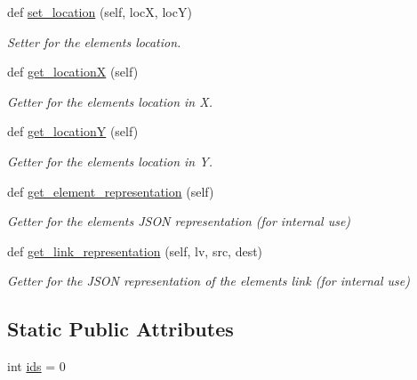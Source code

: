 \begin{DoxyCompactItemize}
def \hyperlink{classbridges_1_1element_1_1_element_aa1387621f7afa6b6f6acd052a1126320}{set\+\_\+location} (self, locX, locY)
\begin{DoxyCompactList}\small\item\em Setter for the element\textquotesingle{}s location. \end{DoxyCompactList}\item 
def \hyperlink{classbridges_1_1element_1_1_element_aa921953dab3cec5253e813bb1709895a}{get\+\_\+locationX} (self)
\begin{DoxyCompactList}\small\item\em Getter for the element\textquotesingle{}s location in X. \end{DoxyCompactList}\item 
def \hyperlink{classbridges_1_1element_1_1_element_a108f62843d084beaf5fcf5fd202853c5}{get\+\_\+locationY} (self)
\begin{DoxyCompactList}\small\item\em Getter for the element\textquotesingle{}s location in Y. \end{DoxyCompactList}\item 
def \hyperlink{classbridges_1_1element_1_1_element_a511fbc6323616d806ae0ae33010f4654}{get\+\_\+element\+\_\+representation} (self)
\begin{DoxyCompactList}\small\item\em Getter for the element\textquotesingle{}s J\+S\+ON representation (for internal use) \end{DoxyCompactList}\item 
def \hyperlink{classbridges_1_1element_1_1_element_a8f220d7b81c0e0dd84b9eff33ade76b9}{get\+\_\+link\+\_\+representation} (self, lv, src, dest)
\begin{DoxyCompactList}\small\item\em Getter for the J\+S\+ON representation of the element\textquotesingle{}s link (for internal use) \end{DoxyCompactList}\end{DoxyCompactItemize}
\subsection*{Static Public Attributes}
\begin{DoxyCompactItemize}
\item 
int \hyperlink{classbridges_1_1element_1_1_element_a61f02c915a65554b76dd6534e5a4d834}{ids} = 0
\end{DoxyCompactItemize}


